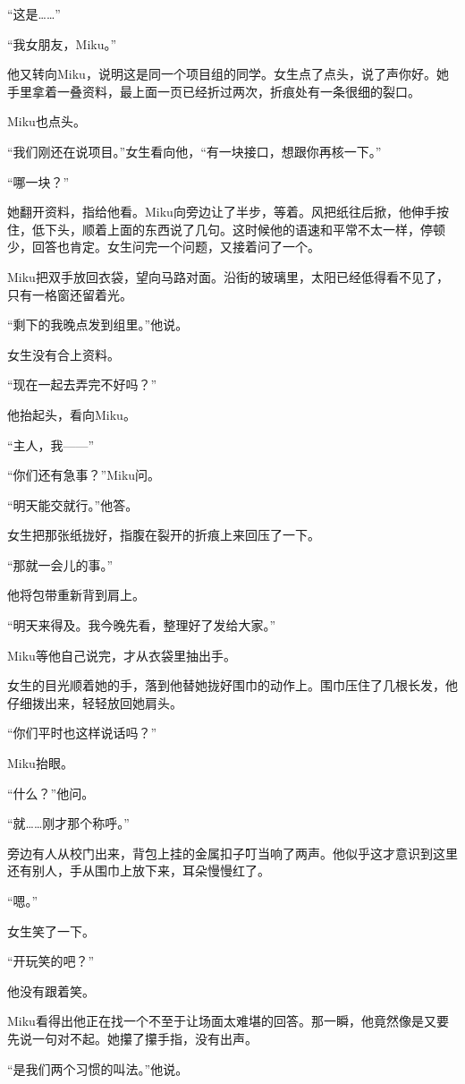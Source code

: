 “这是……”

“我女朋友，Miku。”

他又转向Miku，说明这是同一个项目组的同学。女生点了点头，说了声你好。她手里拿着一叠资料，最上面一页已经折过两次，折痕处有一条很细的裂口。

Miku也点头。

“我们刚还在说项目。”女生看向他，“有一块接口，想跟你再核一下。”

“哪一块？”

她翻开资料，指给他看。Miku向旁边让了半步，等着。风把纸往后掀，他伸手按住，低下头，顺着上面的东西说了几句。这时候他的语速和平常不太一样，停顿少，回答也肯定。女生问完一个问题，又接着问了一个。

Miku把双手放回衣袋，望向马路对面。沿街的玻璃里，太阳已经低得看不见了，只有一格窗还留着光。

“剩下的我晚点发到组里。”他说。

女生没有合上资料。

“现在一起去弄完不好吗？”

他抬起头，看向Miku。

“主人，我——”

“你们还有急事？”Miku问。

“明天能交就行。”他答。

女生把那张纸拢好，指腹在裂开的折痕上来回压了一下。

“那就一会儿的事。”

他将包带重新背到肩上。

“明天来得及。我今晚先看，整理好了发给大家。”

Miku等他自己说完，才从衣袋里抽出手。

女生的目光顺着她的手，落到他替她拢好围巾的动作上。围巾压住了几根长发，他仔细拨出来，轻轻放回她肩头。

“你们平时也这样说话吗？”

Miku抬眼。

“什么？”他问。

“就……刚才那个称呼。”

旁边有人从校门出来，背包上挂的金属扣子叮当响了两声。他似乎这才意识到这里还有别人，手从围巾上放下来，耳朵慢慢红了。

“嗯。”

女生笑了一下。

“开玩笑的吧？”

他没有跟着笑。

Miku看得出他正在找一个不至于让场面太难堪的回答。那一瞬，他竟然像是又要先说一句对不起。她攥了攥手指，没有出声。

“是我们两个习惯的叫法。”他说。


